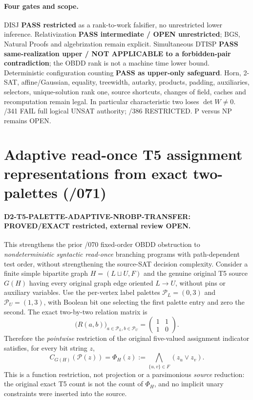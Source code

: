 \documentclass[11pt]{article}
\begin{document}
\paragraph{Four gates and scope.}
DISJ \textbf{PASS restricted} as a rank-to-work
falsifier, no unrestricted lower inference.
Relativization \textbf{PASS intermediate / OPEN
unrestricted}; BGS, Natural Proofs and
algebrization remain explicit.
Simultaneous DTISP \textbf{PASS same-realization
upper / NOT APPLICABLE to a forbidden-pair
contradiction}; the OBDD rank is not a machine
time lower bound. Deterministic configuration
counting \textbf{PASS as upper-only safeguard}.
Horn, 2-SAT, affine/Gaussian, equality,
treewidth, autarky, products, padding,
auxiliaries, selectors, unique-solution rank
one, source shortcuts, changes of field,
caches and recomputation remain legal.
In particular characteristic two loses
$\det W\ne0$. /341 FAIL full logical
UNSAT authority; /386 RESTRICTED.
P versus NP remains OPEN.

\section{Adaptive read-once T5 assignment representations from exact two-palettes (/071)}
\paragraph{D2-T5-PALETTE-ADAPTIVE-NROBP-TRANSFER: PROVED/EXACT restricted, external review OPEN.}
This strengthens the prior /070 fixed-order OBDD obstruction to
\emph{nondeterministic syntactic read-once} branching programs with
path-dependent test order, without strengthening the source-SAT
decision complexity. Consider a finite simple bipartite graph
$H=(L\sqcup U,F)$ and the genuine original T5 source $G(H)$
having every original graph edge oriented $L\to U$, without
pins or auxiliary variables. Use the per-vertex label palettes
$\mathcal P_L=(0,3)$ and $\mathcal P_U=(1,3)$, with Boolean
bit one selecting the first palette entry and zero the second.
The exact two-by-two relation matrix is
\[
\bigl(R(a,b)\bigr)_{a\in\mathcal P_L,b\in\mathcal P_U}
 =\begin{pmatrix}1&1\\1&0\end{pmatrix}.
\]
Therefore the \emph{pointwise} restriction of the original
five-valued assignment indicator satisfies, for every bit string $z$,
\[
C_{G(H)}(\mathcal P(z))
 = \Phi_H(z)
 :=\bigwedge_{\{u,v\}\in F}(z_u\lor z_v).
\]
This is a function restriction, not projection or a
parsimonious \emph{source} reduction: the original exact
T5 count is not the count of $\Phi_H$, and no implicit
unary constraints were inserted into the source.
\end{document}
